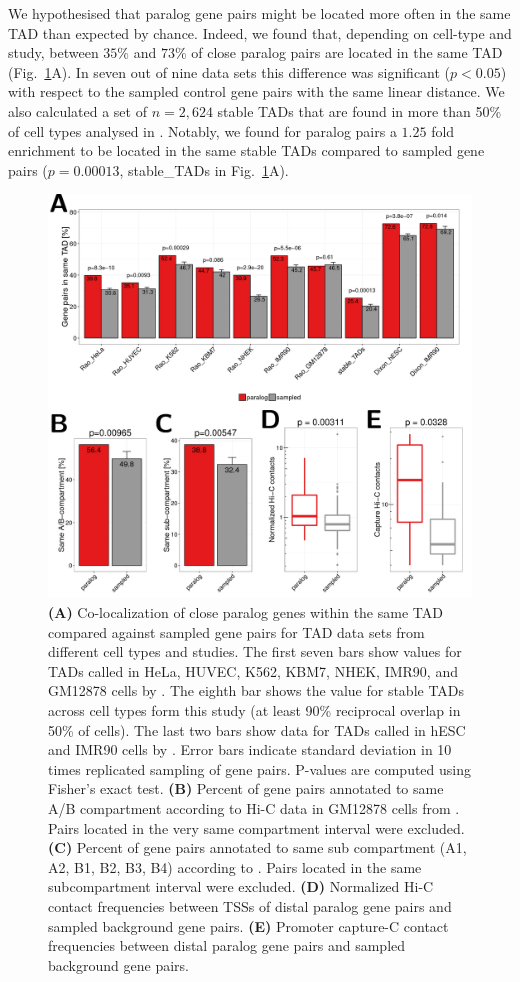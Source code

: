 \documentclass[a4paper,twoside=true,openright,parskip=full,chapterprefix=true,11pt,headings=normal,bibliography=totoc,listof=totoc,titlepage=on,captions=tableabove,draft=false]{scrreprt}
\theoremstyle{definition}
\theoremstyle{definition}
\theoremstyle{definition}
\theoremstyle{remark}
\begin{document}
We hypothesised that paralog gene pairs might be located more often in
the same TAD than expected by chance. Indeed, we found that, depending
on cell-type and study, between \(35\%\) and \(73\%\) of close paralog
pairs are located in the same TAD (Fig.~\ref{fig:TAD}A). In seven out of
nine data sets this difference was significant (\(p<0.05\)) with respect
to the sampled control gene pairs with the same linear distance. We also
calculated a set of \(n=2,624\) stable TADs that are found in more than
50\% of cell types analysed in \citep{Rao2014}. Notably, we found for
paralog pairs a \(1.25\) fold enrichment to be located in the same
stable TADs compared to sampled gene pairs (\(p=0.00013\), stable\_TADs
in Fig.~\ref{fig:TAD}A).

\begin{figure}

{\centering \includegraphics[width=0.8\linewidth]{figures/paralog/fig3_09} 

}

\caption{\textbf{(A)} Co-localization of close paralog genes within the
same TAD compared against sampled gene pairs for TAD data sets from
different cell types and studies. The first seven bars show values for
TADs called in HeLa, HUVEC, K562, KBM7, NHEK, IMR90, and GM12878 cells
by \citep{Rao2014}. The eighth bar shows the value for stable TADs
across cell types form this study (at least 90\% reciprocal overlap in
50\% of cells). The last two bars show data for TADs called in hESC and
IMR90 cells by \citep{Dixon2012}. Error bars indicate standard deviation
in 10 times replicated sampling of gene pairs. P-values are computed
using Fisher's exact test. \textbf{(B)} Percent of gene pairs annotated
to same A/B compartment according to Hi-C data in GM12878 cells from
\citep{Rao2014}. Pairs located in the very same compartment interval
were excluded. \textbf{(C)} Percent of gene pairs annotated to same sub
compartment (A1, A2, B1, B2, B3, B4) according to \citep{Rao2014}. Pairs
located in the same subcompartment interval were excluded. \textbf{(D)}
Normalized Hi-C contact frequencies between TSSs of distal paralog gene
pairs and sampled background gene pairs. \textbf{(E)} Promoter capture-C
contact frequencies between distal paralog gene pairs and sampled
background gene pairs.}\label{fig:TAD}
\end{figure}
\end{document}
